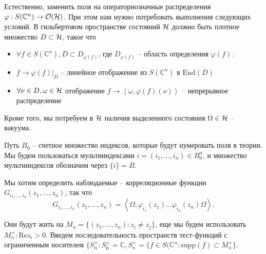 \documentclass[a4paper,12pt]{article}
\theoremstyle{definition}
\begin{document}
Естественно, заменить поля на операторнозначные распределения
$\varphi:S(\mathbb{C}^n)\to {\cal O}({\cal H})$. При этом нам нужно
потребовать выполнения следующих условий. В гильбертовом пространстве
состояний ${\cal H}$ должно быть плотное множество $D\subset {\cal
  H}$, такое что
\begin{itemize}
\item $\forall f\in S(\mathbb{C}^n), D\subset D_{\varphi(f)}$, где
  $D_{\varphi(f)}$ -- область определения $\varphi(f)$.
\item $f\to \varphi(f)|_D$ -- линейное отображение из
  $S(\mathbb{C}^n)$ в $\mathrm{End}(D)$
\item $\forall \nu\in D, \omega\in {\cal H}$ отображение $f\to
  \left<\omega, \varphi(f)(\nu)\right>$ -- непрерывное распределение
\end{itemize}
Кроме того, мы потребуем в ${\cal H}$ наличия выделенного состояния
$\Omega\in {\cal H}$ -- вакуума. 

Путь $B_0$ -- счетное множество индексов, которые будут нумеровать
поля в теории. Мы будем пользоваться мультииндексами
$i=(i_1,\dots,i_n)\in B_0^n$, и множество мультииндексов обозначим
через $\{i\}=B$. 

Мы хотим определить наблюдаемые -- корреляционные функции
$G_{i_1,\dots, i_n}(z_1,\dots,z_n)$, так что $$G_{i_1,\dots,
  i_n}(z_1,\dots,z_n)=\left<\Omega,\varphi_{i_1}(z_1)\dots
  \varphi_{i_n}(z_n)\Omega\right>.$$

Они будут жить на $M_n=\{(z_1,\dots,z_n): z_i\neq z_j\}$, еще мы будем
использовать $M_n^+: \mathrm{Re}z_i>0$. Введем последовательность
пространств тест-функций с ограниченным носителем $\{S_n^+: S_0^+=\mathbb{C}, S_n^+=\{f\in
  S(\mathbb{C}^n: \mathrm{supp}(f)\subset M_n^+\}$.
\end{document}

